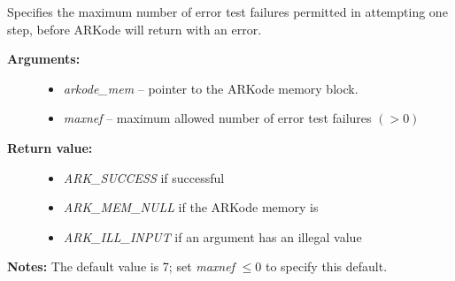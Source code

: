 \documentclass[letterpaper,10pt,english]{sphinxmanual}
\begin{document}
\begin{fulllineitems}
\label{c_interface/User_callable:c.ARKodeSetMaxErrTestFails}
Specifies the maximum number of error test failures
permitted in attempting one step, before ARKode
will return with an error.
\begin{description}
\item[{\textbf{Arguments:}}] \leavevmode\begin{itemize}
\item {} 
\emph{arkode\_mem} -- pointer to the ARKode memory block.

\item {} 
\emph{maxnef} -- maximum allowed number of error test failures \((>0)\)

\end{itemize}

\item[{\textbf{Return value:}}] \leavevmode\begin{itemize}
\item {} 
\emph{ARK\_SUCCESS} if successful

\item {} 
\emph{ARK\_MEM\_NULL} if the ARKode memory is 

\item {} 
\emph{ARK\_ILL\_INPUT} if an argument has an illegal value

\end{itemize}

\end{description}

\textbf{Notes:} The default value is 7; set \emph{maxnef} \(\le 0\)
to specify this default.

\end{fulllineitems}

\end{document}
